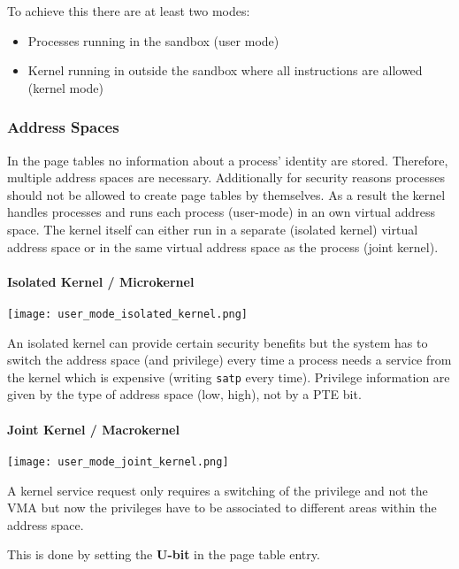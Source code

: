 To achieve this there are at least two modes:
\begin{itemize}
    \item Processes running in the sandbox (user mode)
    \item Kernel running in outside the sandbox where all instructions are allowed (kernel mode)
\end{itemize}

\subsubsection{Address Spaces}
In the page tables no information about a process' identity are stored. Therefore, multiple address spaces are necessary. Additionally for security reasons processes should not be allowed to create page tables by themselves. As a result the kernel handles processes and runs each process (user-mode) in an own virtual address space. The kernel itself can either run in a separate (isolated kernel) virtual address space or in the same virtual address space as the process (joint kernel).

\paragraph{Isolated Kernel / Microkernel}

\texttt{[image: user\_mode\_isolated\_kernel.png]}

An isolated kernel can provide certain security benefits but the system has to switch the address space (and privilege) every time a process needs a service from the kernel which is expensive (writing \texttt{satp} every time). Privilege information are given by the type of address space (low, high), not by a PTE bit.

\paragraph{Joint Kernel / Macrokernel}

\texttt{[image: user\_mode\_joint\_kernel.png]}

A kernel service request only requires a switching of the privilege and not the VMA but now the privileges have to be associated to different areas within the address space. 

\newpar{}

This is done by setting the \textbf{U-bit} in the page table entry.

